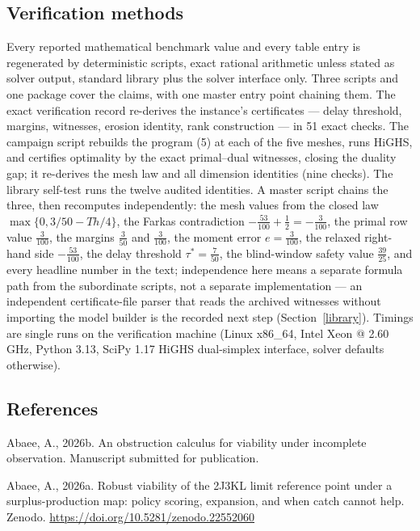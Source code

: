 \documentclass[10pt,twocolumn]{article}
\theoremstyle{plain}
\theoremstyle{definition}
\theoremstyle{remark}
\begin{document}
\subsection{Verification methods}\label{methods}

Every reported mathematical benchmark value and every table entry is
regenerated by deterministic scripts, exact rational arithmetic unless
stated as solver output, standard library plus the solver interface only.
Three scripts and one package cover the claims, with one master entry
point chaining them. The exact
verification record re-derives the instance's certificates --- delay
threshold, margins, witnesses, erosion identity, rank construction ---
in 51 exact checks. The campaign script rebuilds the program (5) at each of
the five meshes, runs HiGHS, and certifies optimality by the exact
primal--dual witnesses, closing the duality gap; it re-derives the mesh law
and all dimension identities (nine checks). The library self-test runs the
twelve audited identities. A master script chains the three, then
recomputes independently: the mesh values from the closed law
\(\max\{0, 3/50 - Th/4\}\), the Farkas contradiction
\(-\tfrac{53}{100} + \tfrac12 = -\tfrac{3}{100}\), the primal row value
\(\tfrac{3}{100}\), the margins \(\tfrac{3}{50}\) and \(\tfrac{3}{100}\),
the moment error \(e = \tfrac{3}{100}\), the relaxed right-hand side
\(-\tfrac{53}{100}\), the delay threshold \(\tau^{*} = \tfrac{7}{50}\), the blind-window safety value \(\tfrac{39}{25}\), and every headline
number in the text; independence here means a separate formula path from
the subordinate scripts, not a separate implementation --- an independent
certificate-file parser that reads the archived witnesses without
importing the model builder is the recorded next step
(Section~\ref{library}). Timings are single runs on the verification
machine (Linux x86\_64, Intel Xeon @ 2.60 GHz, Python 3.13, SciPy 1.17
HiGHS dual-simplex interface, solver defaults otherwise).

\subsection*{References}

Abaee, A., 2026b. An obstruction calculus for viability under incomplete
observation. Manuscript submitted for publication.

Abaee, A., 2026a. Robust viability of the 2J3KL limit reference point
under a surplus-production map: policy scoring, expansion, and when catch
cannot help. Zenodo. \url{https://doi.org/10.5281/zenodo.22552060}
\end{document}

